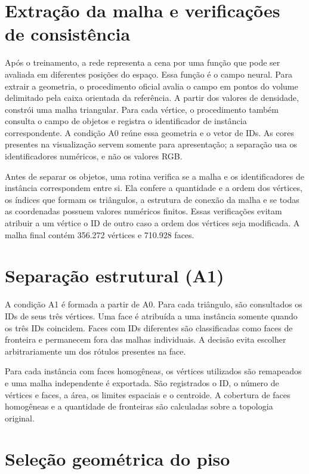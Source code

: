 \section{Extração da malha e verificações de consistência}

Após o treinamento, a rede representa a cena por uma função que pode ser avaliada em diferentes posições do espaço. Essa função é o campo neural. Para extrair a geometria, o procedimento oficial avalia o campo em pontos do volume delimitado pela caixa orientada da referência. A partir dos valores de densidade, constrói uma malha triangular. Para cada vértice, o procedimento também consulta o campo de objetos e registra o identificador de instância correspondente. A condição A0 reúne essa geometria e o vetor de IDs. As cores presentes na visualização servem somente para apresentação; a separação usa os identificadores numéricos, e não os valores RGB.

Antes de separar os objetos, uma rotina verifica se a malha e os identificadores de instância correspondem entre si. Ela confere a quantidade e a ordem dos vértices, os índices que formam os triângulos, a estrutura de conexão da malha e se todas as coordenadas possuem valores numéricos finitos. Essas verificações evitam atribuir a um vértice o ID de outro caso a ordem dos vértices seja modificada. A malha final contém 356.272 vértices e 710.928 faces.

\section{Separação estrutural (A1)}

A condição A1 é formada a partir de A0. Para cada triângulo, são consultados os IDs de seus três vértices. Uma face é atribuída a uma instância somente quando os três IDs coincidem. Faces com IDs diferentes são classificadas como faces de fronteira e permanecem fora das malhas individuais. A decisão evita escolher arbitrariamente um dos rótulos presentes na face.

Para cada instância com faces homogêneas, os vértices utilizados são remapeados e uma malha independente é exportada. São registrados o ID, o número de vértices e faces, a área, os limites espaciais e o centroide. A cobertura de faces homogêneas e a quantidade de fronteiras são calculadas sobre a topologia original.

\section{Seleção geométrica do piso}

